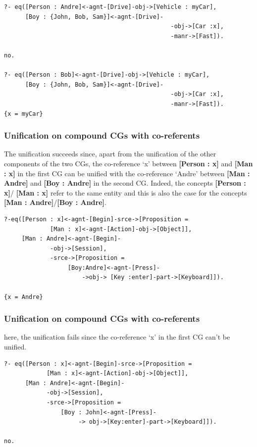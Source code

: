 \documentclass{book}
\begin{document}
\begin{verbatim}
?- eq([Person : Andre]<-agnt-[Drive]-obj->[Vehicle : myCar],
      [Boy : {John, Bob, Sam}]<-agnt-[Drive]-
                                               -obj->[Car :x],
                                               -manr->[Fast]).

no.

?- eq([Person : Bob]<-agnt-[Drive]-obj->[Vehicle : myCar],
      [Boy : {John, Bob, Sam}]<-agnt-[Drive]-
                                               -obj->[Car :x],
                                               -manr->[Fast]).
{x = myCar}
\end{verbatim}





\subsubsection{Unification on compound CGs with co-referents}

The unification succeeds since, apart from the unification of the
other components of the two CGs, the co-reference `x' between {\bf
[Person : x]} and {\bf [Man : x]} in the first CG can be unified with
the co-reference `Andre' between {\bf [Man : Andre]} and {\bf [Boy :
Andre]} in the second CG. Indeed, the concepts {\bf [Person : x]}/{\bf
[Man : x]} refer to the same entity and this is also the case for the
concepts {\bf [Man : Andre]}/{\bf [Boy : Andre]}.


\begin{verbatim}
?-eq([Person : x]<-agnt-[Begin]-srce->[Proposition = 
             [Man : x]<-agnt-[Action]-obj->[Object]],
     [Man : Andre]<-agnt-[Begin]-
             -obj->[Session],
             -srce->[Proposition = 
                  [Boy:Andre]<-agnt-[Press]-
                      ->obj-> [Key :enter]-part->[Keyboard]]).

{x = Andre}
\end{verbatim}





\subsubsection{Unification on compound CGs with co-referents}

here, the unification fails since the co-reference `x' in the first CG
can't be unified.


\begin{verbatim}
?- eq([Person : x]<-agnt-[Begin]-srce->[Proposition = 
            [Man : x]<-agnt-[Action]-obj->[Object]],
      [Man : Andre]<-agnt-[Begin]-
            -obj->[Session], 
            -srce->[Proposition = 
                [Boy : John]<-agnt-[Press]-
                     -> obj->[Key:enter]-part->[Keyboard]]).

no.
\end{verbatim}
\end{document}
